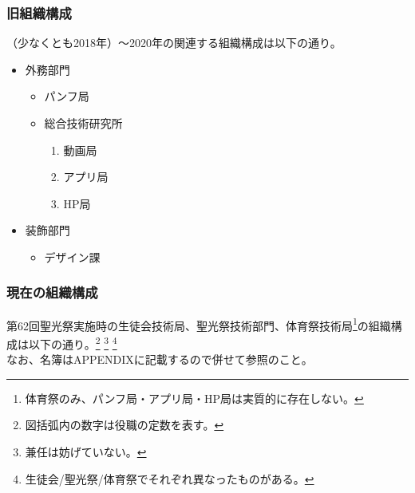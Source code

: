 \documentclass[dvipdfmx,jb5]{jarticle}
\begin{document}
\subsubsection{旧組織構成}
（少なくとも2018年）〜2020年の関連する組織構成は以下の通り。
\begin{itemize}
\item 外務部門
  \begin{itemize}
  \item パンフ局
  \item 総合技術研究所
    \begin{enumerate}[−]
    \item 動画局
    \item アプリ局
    \item HP局
    \end{enumerate}
  \end{itemize}
\item 装飾部門
  \begin{itemize}
  \item デザイン課
  \end{itemize}
\end{itemize}

\subsubsection{現在の組織構成}
第62回聖光祭実施時の生徒会技術局、聖光祭技術部門、体育祭技術局\footnote{体育祭のみ、パンフ局・アプリ局・HP局は実質的に存在しない。}の組織構成は以下の通り。\footnote{図括弧内の数字は役職の定数を表す。} \footnote{兼任は妨げていない。} \footnote{生徒会/聖光祭/体育祭でそれぞれ異なったものがある。}\\
なお、名簿はAPPENDIXに記載するので併せて参照のこと。
\end{document}
